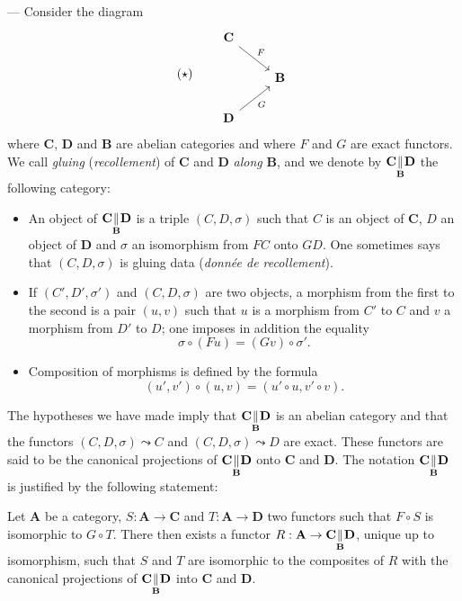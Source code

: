 --- Consider the diagram
\[
(\star)\qquad
\begin{tikzcd}
\mathbf{C} \arrow[dr, "F"] \\
& \mathbf{B} \\
\mathbf{D} \arrow[ur, "G"']
\end{tikzcd}
\]
where $\mathbf{C}$, $\mathbf{D}$ and $\mathbf{B}$ are abelian categories
and where $F$ and $G$ are exact functors. We call \emph{gluing}
(\emph{recollement}) of $\mathbf{C}$ and $\mathbf{D}$ \emph{along}
$\mathbf{B}$, and we denote by
$\mathbf{C} \underset{\mathbf{B}}{\Vert} \mathbf{D}$ the following category:

\begin{itemize}
\item An object of $\mathbf{C} \underset{\mathbf{B}}{\Vert} \mathbf{D}$ is a
      triple $(C, D, \sigma)$ such that $C$ is an object of
      $\mathbf{C}$, $D$ an object of $\mathbf{D}$ and $\sigma$ an
      isomorphism from $FC$ onto $GD$. One sometimes says that
      $(C, D, \sigma)$ is gluing data (\emph{donnée de recollement}).

\item If $(C', D', \sigma')$ and $(C, D, \sigma)$ are two objects, a
      morphism from the first to the second is a pair $(u, v)$ such that
      $u$ is a morphism from $C'$ to $C$ and $v$ a morphism from $D'$
      to $D$; one imposes in addition the equality
      \[
        \sigma \circ (Fu) = (Gv) \circ \sigma'.
      \]

\item Composition of morphisms is defined by the formula
      \[
        (u', v') \circ (u, v) = (u' \circ u, v' \circ v).
      \]
\end{itemize}

The hypotheses we have made imply that
$\mathbf{C} \underset{\mathbf{B}}{\Vert} \mathbf{D}$ is an abelian category
and that the functors $(C, D, \sigma) \leadsto C$ and
$(C, D, \sigma) \leadsto D$ are exact. These functors are said to be the
canonical projections of
$\mathbf{C} \underset{\mathbf{B}}{\Vert} \mathbf{D}$ onto $\mathbf{C}$ and
$\mathbf{D}$. The notation
$\mathbf{C} \underset{\mathbf{B}}{\Vert} \mathbf{D}$ is justified by the
following statement:

\begin{proposition}
Let $\mathbf{A}$ be a category, $S : \mathbf{A} \to \mathbf{C}$ and
$T : \mathbf{A} \to \mathbf{D}$ two functors such that $F \circ S$ is
isomorphic to $G \circ T$. There then exists a functor
$R : \mathbf{A} \to
\mathbf{C} \underset{\mathbf{B}}{\Vert} \mathbf{D}$, unique up to isomorphism,
such that $S$ and $T$ are isomorphic to the composites of $R$ with the
canonical projections of
$\mathbf{C} \underset{\mathbf{B}}{\Vert} \mathbf{D}$ into $\mathbf{C}$ and
$\mathbf{D}$.
\end{proposition}

